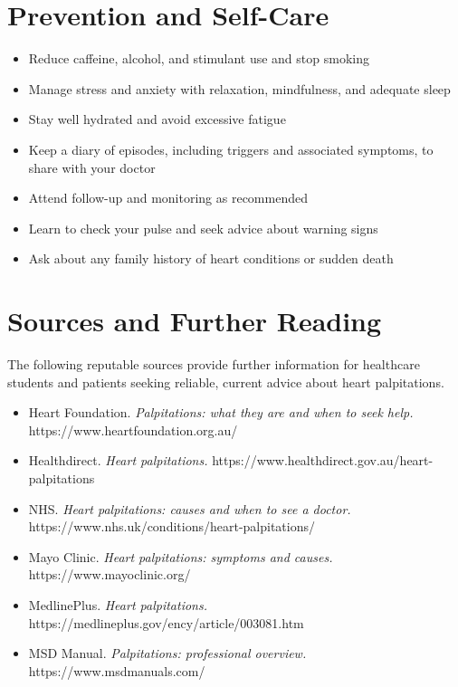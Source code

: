 \section*{Prevention and Self-Care}
\begin{itemize}
    \item Reduce caffeine, alcohol, and stimulant use and stop smoking
    \item Manage stress and anxiety with relaxation, mindfulness, and adequate sleep
    \item Stay well hydrated and avoid excessive fatigue
    \item Keep a diary of episodes, including triggers and associated symptoms, to share with your doctor
    \item Attend follow-up and monitoring as recommended
    \item Learn to check your pulse and seek advice about warning signs
    \item Ask about any family history of heart conditions or sudden death
\end{itemize}

\section*{Sources and Further Reading}
The following reputable sources provide further information for healthcare students and patients seeking reliable, current advice about heart palpitations.

\begin{itemize}
    \item Heart Foundation. \textit{Palpitations: what they are and when to seek help.} https://www.heartfoundation.org.au/
    \item Healthdirect. \textit{Heart palpitations.} https://www.healthdirect.gov.au/heart-palpitations
    \item NHS. \textit{Heart palpitations: causes and when to see a doctor.} https://www.nhs.uk/conditions/heart-palpitations/
    \item Mayo Clinic. \textit{Heart palpitations: symptoms and causes.} https://www.mayoclinic.org/
    \item MedlinePlus. \textit{Heart palpitations.} https://medlineplus.gov/ency/article/003081.htm
    \item MSD Manual. \textit{Palpitations: professional overview.} https://www.msdmanuals.com/
\end{itemize}
